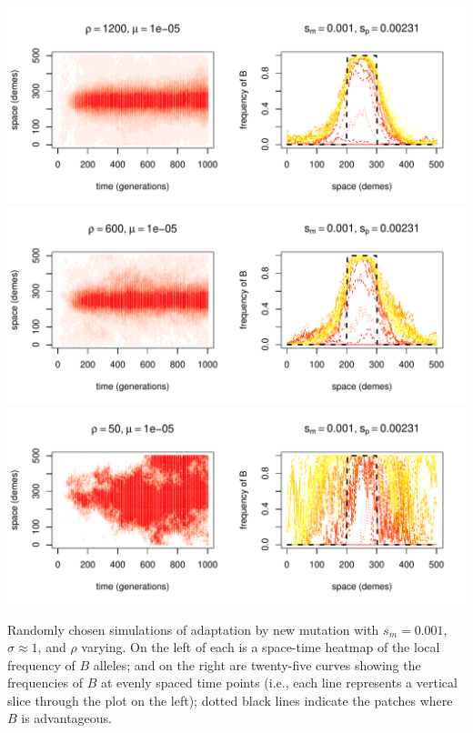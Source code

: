 \documentclass{article}
\begin{document}
\begin{sfigure}
  \begin{center}
    \includegraphics{example-mutation-sims/59611-r1-501-sb0_01-sm-0_001-N1200-pophistory-run}
    \includegraphics{example-mutation-sims/93713-r1-501-sb0_01-sm-0_001-N600-pophistory-run}
    \includegraphics{example-mutation-sims/29850-r1-501-sb0_01-sm-0_001-N50-pophistory-run}
  \end{center}
  \caption{
    Randomly chosen simulations of adaptation by new mutation
    with $s_m=0.001$, $\sigma\approx 1$, and $\rho$ varying.
    On the left of each is a space-time heatmap of the local frequency of $B$ alleles;
    and on the right are twenty-five curves showing the frequencies of $B$ at evenly spaced time points
    (i.e., each line represents a vertical slice through the plot on the left);
    dotted black lines indicate the patches where $B$ is advantageous.
  } \label{sfig:sims_3}
\end{sfigure}
\end{document}
